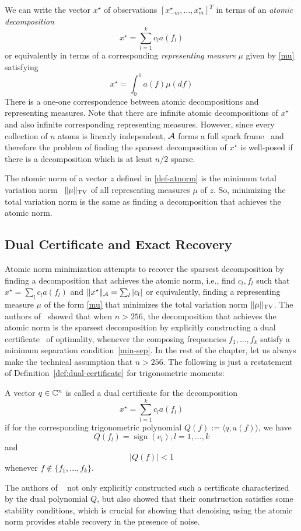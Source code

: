 We can write the vector $x^\star$ of observations $[x_{-m}^\star, \ldots, x_m^\star]^T$ in terms of an \emph{atomic decomposition}
\[
x^\star = \sum_{l=1}^k c_l a(f_l)
\]
or equivalently in terms of a corresponding \emph{representing measure} $\mu$ given by \eqref{mu} satisfying
\[
x^\star = \int_0^1 a(f) \mu(df)
\]
There is a one-one correspondence between atomic decompositions and representing
measures. Note that there are infinite atomic decompositions of $x^\star$ and
also infinite corresponding representing measures. However, since every
collection of $n$ atoms is linearly independent, $\mathcal{A}$ forms a full spark
frame~\cite{spark} and therefore the problem of finding the sparsest
decomposition of $x^\star$ is well-posed if there is a decomposition which is at
least $n/2$ sparse.

The atomic norm of a vector $z$ defined in \eqref{def-atnorm} is the minimum
total variation norm~\cite{cs_otg,tvnorm} $\lVert\mu\rVert_{\mathrm{TV}}$ of all
representing measures $\mu$ of $z$. So, minimizing the total variation norm is
the same as finding a decomposition that achieves the atomic norm.


\subsection{Dual Certificate and Exact Recovery}

Atomic norm minimization attempts to recover the sparsest decomposition by
finding a decomposition that achieves the atomic norm, i.e., find ${c_l,f_l}$
such that $x^\star = \sum_l c_l a(f_l)$ and $ \lVert x^\star\rVert_{\mathcal{A}} = \sum_l |c_l|
$ or equivalently, finding a representing measure $\mu$ of the form \eqref{mu}
that minimizes the total variation norm $ \lVert\mu\rVert_{\mathrm{TV}}$. The
authors of~\cite{cg_exact12} showed that when $n > 256$, the decomposition that
achieves the atomic norm is the sparsest decomposition by explicitly
constructing a dual certificate~\cite{dualcert} of optimality, whenever the
composing frequencies $f_1, \ldots, f_k$ satisfy a minimum separation
condition~\eqref{min-sep}. In the rest of the chapter, let us always make the
technical assumption that $n > 256$. The following is just a restatement of Definition~\ref{def:dual-certificate} for trigonometric moments:

\begin{definition}
\label{dual-cert}
A vector $q \in \mathbb{C}^n$ is called a dual certificate for the decomposition \[
x^\star = \sum_{l=1}^k c_l a(f_l)
\] if for the corresponding trigonometric polynomial $Q(f) := \langle q, a(f) \rangle$, we have
$$Q(f_l) = \operatorname{sign}(c_l), l = 1, \ldots, k$$  and $$|Q(f)| < 1$$ whenever $f\not\in \{ f_1, \ldots, f_k\}$.
\end{definition}
The authors of ~\cite{cg_exact12} not only explicitly constructed 
such a certificate characterized by the dual polynomial $Q$, but also showed that their construction satisfies some stability conditions, which is crucial for showing that denoising using the atomic norm provides stable recovery in the presence of noise.

